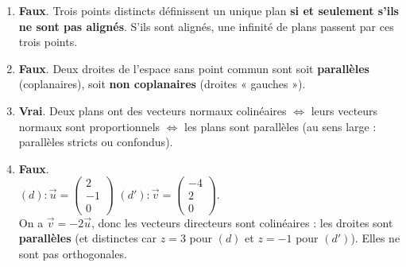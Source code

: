 \documentclass[11pt]{article}
\begin{document}
\begin{corrige}
\begin{enumerate}
\item \textbf{Faux}. Trois points distincts définissent un unique plan \textbf{si et seulement s'ils ne sont pas alignés}. S'ils sont alignés, une infinité de plans passent par ces trois points.

\item \textbf{Faux}. Deux droites de l'espace sans point commun sont soit \textbf{parallèles} (coplanaires), soit \textbf{non coplanaires} (droites « gauches »).

\item \textbf{Vrai}. Deux plans ont des vecteurs normaux colinéaires $\iff$ leurs vecteurs normaux sont proportionnels $\iff$ les plans sont parallèles (au sens large : parallèles stricts ou confondus).

\item \textbf{Faux}.\\
$(d) : \vec{u} = \begin{pmatrix}2 \\ -1 \\ 0\end{pmatrix}$ \quad $(d') : \vec{v} = \begin{pmatrix}-4 \\ 2 \\ 0\end{pmatrix}$.\\
On a $\vec{v} = -2\vec{u}$, donc les vecteurs directeurs sont colinéaires : les droites sont \textbf{parallèles} (et distinctes car $z=3$ pour $(d)$ et $z=-1$ pour $(d')$). Elles ne sont pas orthogonales.
\end{enumerate}
\end{corrige}
\end{document}
